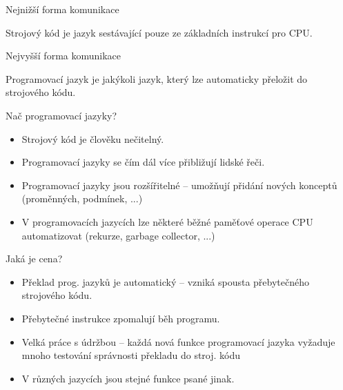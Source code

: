 \begin{frame}{Nejnižší forma komunikace}
 \begin{tcolorbox}[title=Strojový kód]
  Strojový kód je jazyk sestávající pouze ze \alert{základních instrukcí} pro
  CPU.
 \end{tcolorbox}
\end{frame}

\begin{frame}{Nejvyšší forma komunikace}
 \begin{tcolorbox}[title=Programovací jazyk]
  Programovací jazyk je jakýkoli jazyk, který lze \alert{automaticky přeložit}
  do strojového kódu.
 \end{tcolorbox}
\end{frame}

\begin{frame}{Nač programovací jazyky?}
 \begin{itemize}
  \item<1-> Strojový kód je člověku nečitelný.
  \item<2-> Programovací jazyky se čím dál více přibližují lidské řeči.
  \item<3-> Programovací jazyky jsou rozšířitelné -- umožňují přidání nových
   konceptů (proměnných, podmínek, ...)
  \item<4-> V programovacích jazycích lze některé běžné paměťové operace CPU
   automatizovat (rekurze, garbage collector, ...)
 \end{itemize}
\end{frame}

\begin{frame}{Jaká je cena?}
 \begin{itemize}
  \item<1-> Překlad prog. jazyků je automatický -- vzniká spousta přebytečného
   strojového kódu.
  \item<2-> Přebytečné instrukce zpomalují běh programu.
  \item<3-> Velká práce s údržbou -- každá nová funkce programovací jazyka
   vyžaduje mnoho testování správnosti překladu do stroj. kódu
  \item<4-> V různých jazycích jsou stejné funkce psané jinak.
 \end{itemize}
\end{frame}

